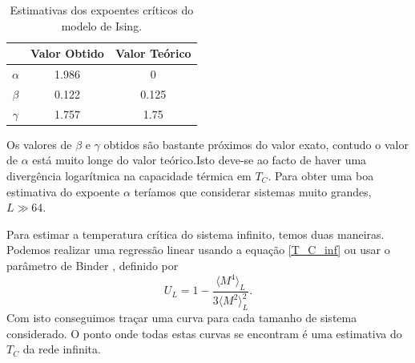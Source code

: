\documentclass[12pt, a4paper]{article}
\begin{document}
	\begin{table}[h]
	\centering
	\caption{Estimativas dos expoentes críticos do modelo de Ising.}
	\begin{tabular}{c|cc}
	      & Valor Obtido & Valor Teórico \\ \hline
	$\alpha$ & 1.986        & 0             \\
	$\beta$  & 0.122        & 0.125         \\
	$\gamma$ & 1.757        & 1.75         
	\end{tabular}
	\end{table}
	Os valores de $\beta$ e $\gamma$ obtidos são bastante próximos do valor exato, contudo o valor de $\alpha$ está muito longe do valor teórico.Isto deve-se ao facto de haver uma divergência logarítmica na capacidade térmica em $T_C$. Para obter uma boa estimativa do expoente $\alpha$ teríamos que considerar sistemas muito grandes, $L \gg 64$.
	
	Para estimar a temperatura crítica do sistema infinito, temos duas maneiras. Podemos realizar uma regressão linear usando a equação \ref{T_C_inf} ou usar o parâmetro de Binder \cite{mc_book}, definido por
	\begin{equation}
		U_L = 1 - \frac{\langle M^4 \rangle_L}{3\langle M^2 \rangle^2_L}.
	\end{equation}
	Com isto conseguimos traçar uma curva para cada tamanho de sistema considerado. O ponto onde todas estas curvas se encontram é uma estimativa do $T_C$ da rede infinita.
	
	\pagebreak	
	
\end{document}
